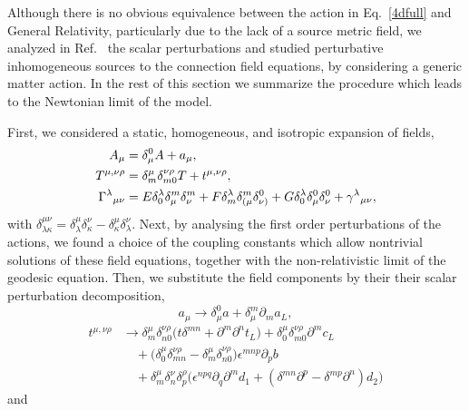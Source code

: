 \documentclass[aps,prd,12pt,twocolumn,superscriptaddress,showpacs,showkeys,reprint,longbibliography]{revtex4-1}
\renewcommand{\(}{\left(}
\renewcommand{\)}{\right)}
\renewcommand{\[}{\left[}
\renewcommand{\]}{\right]}
\begin{document}
Although there is no obvious equivalence between the action in Eq.~\eqref{4dfull} and General Relativity, particularly due to the lack of a source metric field, we analyzed in Ref.~\cite{Skirzewski:2014eta} the scalar perturbations and studied perturbative inhomogeneous sources to the connection field equations, by considering a generic matter action. In the rest of this section we summarize the procedure which leads to the Newtonian limit of the model.

First, we considered a static, homogeneous, and isotropic expansion of fields,
\begin{align}
  A_\mu &= \delta_\mu^0 A + a_\mu, \notag \\
  T^{\mu,\nu\rho} &= \delta^{\mu}_m\delta^{\nu\rho}_{m0}T + t^{\mu,\nu\rho},
  \label{GammaExp} \\
  \Gamma^\lambda{}_{\mu\nu} &= E \delta^\lambda_0 \delta^m_\mu \delta^m_\nu + F \delta^\lambda_m \delta^m_{(\mu}\delta^0_{\nu)} + G\delta^\lambda_0 \delta^0_{\mu}\delta^0_{\nu} + \gamma^\lambda{}_{\mu\nu}, \notag
\end{align}
with $\delta^{\mu\nu}_{\lambda\kappa}=\delta^{\mu}_{\lambda}\delta^{\nu}_{\kappa}-\delta^{\mu}_{\kappa}\delta^{\nu}_{\lambda}$. Next, by analysing the first order perturbations of the actions, we found a choice of the coupling constants which allow nontrivial solutions of these field equations, together with the non-relativistic limit of the geodesic equation. Then, we substitute the field components by their their scalar perturbation decomposition,
\begin{equation}
  a_\mu \to \delta_\mu^0 a+\delta_\mu^m \partial_{m}a_L,
\end{equation}
\begin{equation}
  \begin{split}
    t^{\mu,\nu\rho} &\to \delta^{\mu}_m\delta^{\nu\rho}_{n0} \Big(t \delta^{m n} + \partial^m \partial^n t_L \Big)
    +\delta^{\mu}_0 \delta^{\nu\rho}_{m0} \partial^m c_L
    \\
    & \quad + \Big(\delta^{\mu}_0\delta^{\nu\rho}_{mn}-\delta^{\mu}_m\delta^{\nu\rho}_{n0}\Big)\epsilon^{m n p} \partial_{p} b
    \\
    & \quad +\delta^{\mu}_m \delta^{\nu}_{n} \delta^{\rho}_{p} \Big(\epsilon^{n p q}\partial_q \partial^m d_1 +  (\delta^{m n} \partial^p - \delta^{m p} \partial^n)d_2\Big)
  \end{split}
\end{equation}
and
\end{document}
